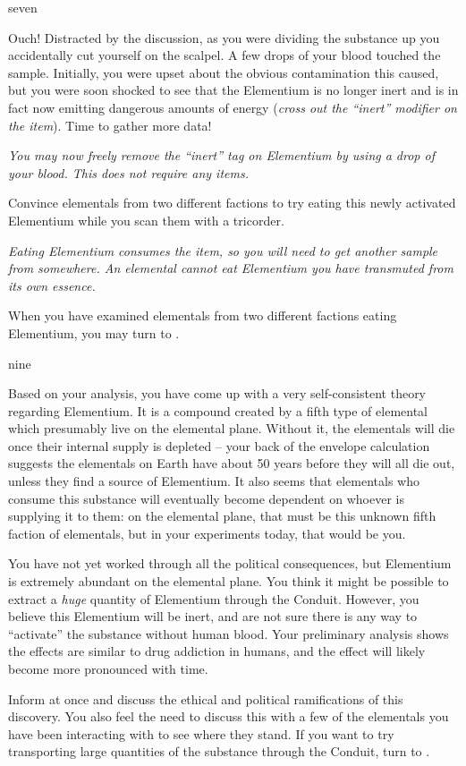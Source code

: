 \documentclass[notebook]{elementals}
\begin{document}
\begin{page}{seven}

Ouch! Distracted by the discussion, as you were dividing the substance up you accidentally cut yourself on the scalpel. A few drops of your blood touched the sample. Initially, you were upset about the obvious contamination this caused, but you were soon shocked to see that the Elementium is no longer inert and is in fact now emitting dangerous amounts of energy (\emph{cross out the ``inert'' modifier on the item}). Time to gather more data!

\emph{You may now freely remove the ``inert'' tag on Elementium by using a drop of your blood. This does not require any items.}

Convince elementals from two different factions to try eating this newly activated Elementium while you scan them with a tricorder.

\emph{Eating Elementium consumes the item, so you will need to get another sample from somewhere. An elemental cannot eat Elementium you have transmuted from its own essence.}

When you have examined elementals from two different factions eating Elementium, you may turn to .

\end{page}

\begin{page}{nine}

Based on your analysis, you have come up with a very self-consistent theory regarding Elementium. It is a compound created by a fifth type of elemental which presumably live on the elemental plane. Without it, the elementals will die once their internal supply is depleted -- your back of the envelope calculation suggests the elementals on Earth have about 50 years before they will all die out, unless they find a source of Elementium. It also seems that elementals who consume this substance will eventually become dependent on whoever is supplying it to them: on the elemental plane, that must be this unknown fifth faction of elementals, but in your experiments today, that would be you.

You have not yet worked through all the political consequences, but Elementium is extremely abundant on the elemental plane. You think it might be possible to extract a \emph{huge} quantity of Elementium through the Conduit. However, you believe this Elementium will be inert, and are not sure there is any way to ``activate'' the substance without human blood. Your preliminary analysis shows the effects are similar to drug addiction in humans, and the effect will likely become more pronounced with time.

Inform \cDiplomat{} at once and discuss the ethical and political ramifications of this discovery. You also feel the need to discuss this with a few of the elementals you have been interacting with to see where they stand. If you want to try transporting large quantities of the substance through the Conduit, turn to .


\end{page}
\end{document}
